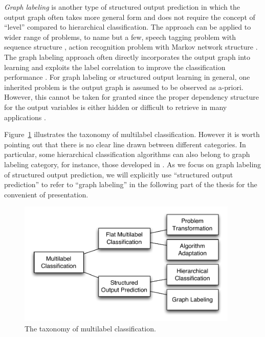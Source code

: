 \textit{Graph labeling} is another type of structured output prediction in which the output graph often takes more general form and does not require the concept of ``level'' compared to hierarchical classification.
The approach can be applied to wider range of problems, to name but a few, speech tagging problem with sequence structure \citep{collins02a}, action recognition problem with Markov network structure \citep{Wang11hidden}. 
The graph labeling approach often directly incorporates the output graph into learning and exploits the label correlation to improve the classification performance \citep{collins02a,lafferty01,taskar02,Taskar04max,THJA04,Rousu07}.
For graph labeling or structured output learning in general, one inherited problem is the output graph is assumed to be observed as a-priori.
However, this cannot be taken for granted since the proper dependency structure for the output variables is either hidden or difficult to retrieve in many applications \citep{Chickering94learning}.

Figure~\ref{multilabel_taxonomy} illustrates the taxonomy of multilabel classification.
However it is worth pointing out that there is no clear line drawn between different categories.
In particular, some hierarchical classification algorithms can also belong to graph labeling category, for instance, those developed in \citep{THJA04,Rousu06}.
As we focus on graph labeling of structured output prediction, we will explicitly use ``structured output prediction'' to refer to ``graph labeling'' in the following part of the thesis for the convenient of presentation.

\begin{figure}
\begin{center}
	\centering
	\includegraphics[width=10.5cm]{./taxonomy.pdf}
	\caption{The taxonomy of multilabel classification.}
	\label{multilabel_taxonomy}
\end{center}
\end{figure}

